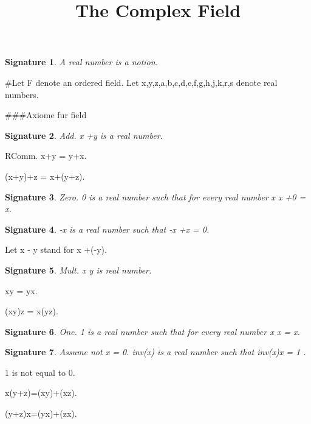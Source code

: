 \documentclass{article}
\newenvironment{forthel}{\begin{leftbar}}{\end{leftbar}}
\newtheorem{axiom}{\begin{axiom} }
\newtheorem{signature}{Signature}
\newcommand{\rmul}{\cdot}
\newcommand{\radd}{+}
\begin{document}
\title{The Complex Field}

\maketitle

\begin{forthel}
[set/-s] [element/-s] [number/-s]
\begin{signature} A real number is a notion.
\end{signature}
#Let F denote an ordered field.
Let x,y,z,a,b,c,d,e,f,g,h,j,k,r,s denote real numbers.

###Axiome fur field 

\begin{signature} Add. x \radd  y is a real number.
\end{signature}
\begin{axiom}  RComm. x\radd y = y\radd x.
\end{axiom}
\begin{axiom}  (x\radd y)\radd z = x\radd (y\radd z).
\end{axiom}
\begin{signature} Zero. 0 is a real number such that for every real number x x \radd  0 = x.
\end{signature}
\begin{signature} -x is a real number such that -x \radd  x = 0.
\end{signature}

Let x - y stand for x \radd  (-y).

\begin{signature} Mult. x \rmul  y is real number.
\end{signature}
\begin{axiom} x\rmul y = y\rmul x.
\end{axiom}
\begin{axiom} (x\rmul y)\rmul z = x\rmul (y\rmul z).
\end{axiom}
\begin{signature} One. 1 is a real number such that for every real number x x\rmul 1 = x.
\end{signature}
\begin{signature} Assume not x = 0. inv(x) is a real number such that inv(x)\rmul x = 1 .
\end{signature}
\begin{axiom} 1 is not equal to 0.
\end{axiom}

\begin{axiom}[Dis1] x\rmul (y\radd z)=(x\rmul y)\radd (x\rmul z).
\end{axiom}
\begin{axiom}[Dis2] (y\radd z)\rmul x=(y\rmul x)\radd (z\rmul x).
\end{axiom}


\end{forthel}
\end{document}
